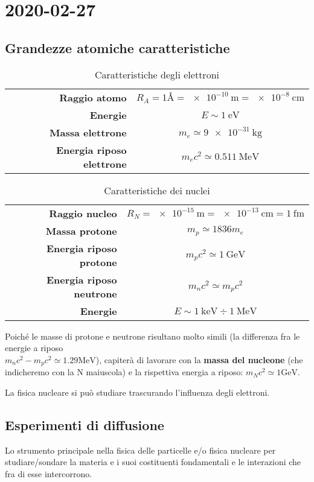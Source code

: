\chapter{2020-02-27} %
\section{Grandezze atomiche caratteristiche}
\begin{table}[ht!]
	\centering
	\caption{Caratteristiche degli elettroni}
	\begin{tabular}{r|c}
		\textbf{Raggio atomo}             & $R_A = 1\si{\angstrom} =
			\SI{e-10}{\m} = \SI{e-8}{\cm}$
		\\
		\textbf{Energie}                  & $E \sim \SI{1}{\eV}$
		\\
		\textbf{Massa elettrone}          & $m_e \simeq \SI{9e-31}{\kg}$
		\\
		\textbf{Energia riposo elettrone} & $m_ec^2 \simeq \SI{0.511}{\MeV}$
	\end{tabular}
\end{table}

\begin{table}[ht!]
	\centering
	\caption{Caratteristiche dei nuclei}
	\begin{tabular}{r|c}
		\textbf{Raggio nucleo}           & $R_N = \SI{e-15}{\m} =
			\SI{e-13}{\cm} = \SI{1}{\femto\m}$
		\\
		\textbf{Massa protone}           & $m_p \simeq 1836 m_e$
		\\
		\textbf{Energia riposo protone}  & $m_pc^2 \simeq \SI{1}{\GeV}$
		\\
		\textbf{Energia riposo neutrone} & $m_nc^2 \simeq m_pc^2$
		\\
		\textbf{Energie}                 & $E \sim \SI{1}{\keV} \div \SI{1}{\MeV}$
	\end{tabular}
\end{table}
Poiché le masse di protone e neutrone risultano molto simili (la differenza fra
le energie a riposo\\ $m_nc^2 - m_pc^2 \simeq 1.29\si{\MeV}$), capiterà di
lavorare con la \textbf{massa del nucleone} (che indicheremo con la N
maiuscola) e la rispettiva energia a riposo: $m_Nc^2 \simeq 1\si{\GeV}$.

La fisica nucleare si può studiare trascurando l'influenza degli elettroni.

\section{Esperimenti di diffusione}
Lo strumento principale nella fisica delle particelle e/o fisica
nucleare per studiare/sondare la materia e i suoi costituenti fondamentali e le
interazioni che fra di esse intercorrono.

